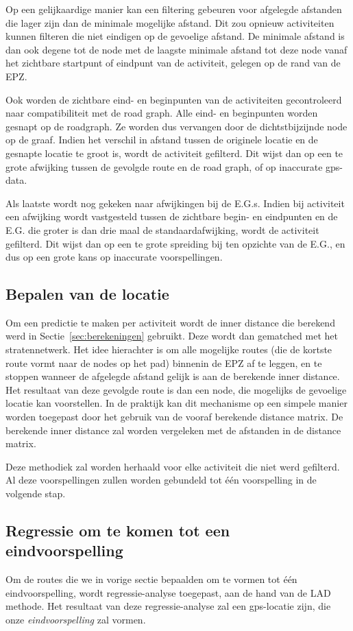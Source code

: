 Op een gelijkaardige manier kan een filtering gebeuren voor afgelegde afstanden
die lager zijn dan de minimale mogelijke afstand. Dit zou opnieuw activiteiten
kunnen filteren die niet eindigen op de gevoelige afstand. De minimale afstand
is dan ook degene tot de node met de laagste minimale afstand tot deze node
vanaf het zichtbare startpunt of eindpunt van de activiteit, gelegen op de rand
van de \ac{EPZ}.

Ook worden de zichtbare eind- en beginpunten van de activiteiten gecontroleerd
naar compatibiliteit met de road graph. Alle eind- en beginpunten worden
gesnapt op de roadgraph. Ze worden dus vervangen door de dichtstbijzijnde node
op de graaf. Indien het verschil in afstand tussen de originele locatie en de
gesnapte locatie te groot is, wordt de activiteit gefilterd. Dit wijst dan op
een te grote afwijking tussen de gevolgde route en de road graph, of op
inaccurate gps-data.

Als laatste wordt nog gekeken naar afwijkingen bij de \acp{E.G.}. Indien bij
activiteit een afwijking wordt vastgesteld tussen de zichtbare begin- en
eindpunten en de \ac{E.G.} die groter is dan drie maal de standaardafwijking,
wordt de activiteit gefilterd. Dit wijst dan op een te grote spreiding bij ten
opzichte van de \ac{E.G.}, en dus op een grote kans op inaccurate
voorspellingen.

\subsection{Bepalen van de locatie}
Om een predictie te maken per activiteit wordt de inner distance die berekend
werd in Sectie~\ref{sec:berekeningen} gebruikt. Deze wordt dan gematched met
het stratennetwerk. Het idee hierachter is om alle mogelijke routes (die de
kortste route vormt naar de nodes op het pad) binnenin de \ac{EPZ} af te
leggen, en te stoppen wanneer de afgelegde afstand gelijk is aan de berekende
inner distance. Het resultaat van deze gevolgde route is dan een node, die
mogelijks de gevoelige locatie kan voorstellen. In de praktijk kan dit
mechanisme op een simpele manier worden toegepast door het gebruik van de
vooraf berekende distance matrix. De berekende inner distance zal worden
vergeleken met de afstanden in de distance matrix.

Deze methodiek zal worden herhaald voor elke activiteit die niet werd
gefilterd. Al deze voorspellingen zullen worden gebundeld tot één voorspelling
in de volgende stap.

\subsection{Regressie om te komen tot een eindvoorspelling}
Om de routes die we in vorige sectie bepaalden om te vormen tot één
eindvoorspelling, wordt regressie-analyse toegepast, aan de hand van de
\ac{LAD} methode. Het resultaat van deze regressie-analyse zal een
\ac{gps}-locatie zijn, die onze \textit{eindvoorspelling} zal vormen.

